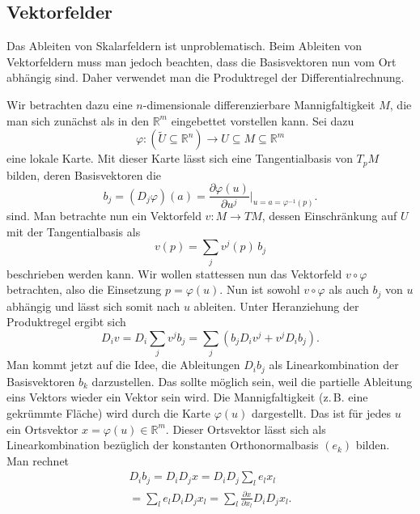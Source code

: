 \documentclass[a4paper,10pt,fleqn,twocolumn,twoside]{article}
\numberwithin{equation}{section}
\newcommand{\R}{\mathbb R}
\begin{document}
\subsection{Vektorfelder}

Das Ableiten von Skalarfeldern ist unproblematisch. Beim Ableiten von
Vektorfeldern muss man jedoch beachten, dass die Basisvektoren nun
vom Ort abhängig sind. Daher verwendet man die Produktregel der
Differentialrechnung.

Wir betrachten dazu eine $n$-dimensionale differenzierbare
Mannigfaltigkeit $M$, die man sich zunächst als in den $\R^m$ eingebettet
vorstellen kann. Sei dazu
\begin{equation}
\varphi\colon (\tilde U\subseteq \R^n)\to U\subseteq M\subseteq\R^m
\end{equation}
eine lokale Karte. Mit dieser Karte lässt sich eine Tangentialbasis
von $T_p M$ bilden, deren Basisvektoren die%
\begin{equation}
b_j = (D_j\varphi)(a)
= \frac{\partial\varphi(u)}{\partial u^j}\bigg|_{u=a=\varphi^{-1}(p)}.
\end{equation}
sind. Man betrachte nun ein Vektorfeld $v\colon M\to TM$, dessen
Einschränkung auf $U$ mit der Tangentialbasis als
\begin{equation}
v(p) = \sum_{j} v^j(p)\,b_j
\end{equation}
beschrieben werden kann. Wir wollen stattessen nun das Vektorfeld
$v\circ\varphi$ betrachten, also die Einsetzung $p=\varphi(u)$.
Nun ist sowohl $v\circ\varphi$ als auch $b_j$ von $u$ abhängig
und lässt sich somit nach $u$ ableiten. Unter Heranziehung der
Produktregel ergibt sich
\begin{equation}
D_i v = D_i\sum_{j}v^j b_j
= \sum_{j}(b_jD_i v^j+v^jD_i b_j).
\end{equation}
Man kommt jetzt auf die Idee, die Ableitungen $D_ib_j$ als
Linearkombination der Basisvektoren $b_k$ darzustellen. Das sollte
möglich sein, weil die partielle Ableitung eins Vektors wieder ein
Vektor sein wird. Die Mannigfaltigkeit (z.\,B. eine gekrümmte Fläche)
wird durch die Karte $\varphi(u)$ dargestellt. Das ist für jedes
$u$ ein Ortsvektor $x=\varphi(u)\in\R^m$. Dieser Ortsvektor lässt
sich als Linearkombination bezüglich der konstanten
Orthonormalbasis $(e_k)$ bilden. Man rechnet
\begin{gather}
D_i b_j = D_i D_j x = D_i D_j\sum_{l} e_l x_l\\
= \sum_{l}e_l D_i D_j x_l
= \sum_{l}\frac{\partial x}{\partial x_l}D_i D_j x_l.
\end{gather}
\end{document}
